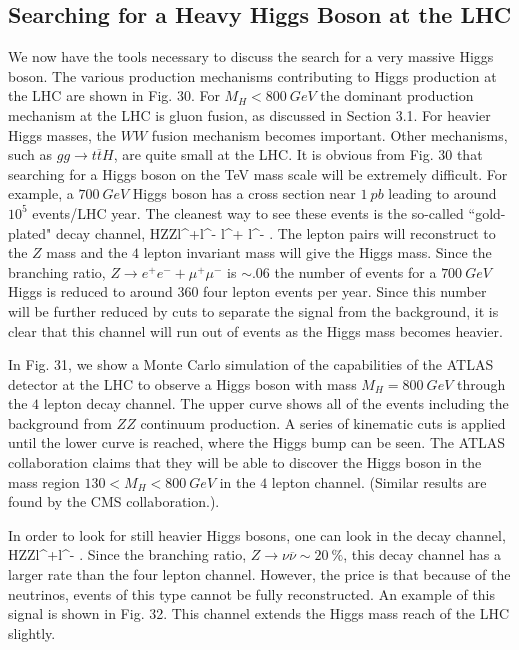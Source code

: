 \subsection{Searching for a Heavy Higgs Boson at the LHC}

We now have the tools necessary to discuss the search for a
very massive Higgs boson.   The various production mechanisms
contributing to Higgs production  at the LHC are shown in Fig. 30.
For $M_H< 800~GeV$ the dominant production mechanism at the LHC is gluon
fusion, as discussed in  Section 3.1.  For heavier Higgs masses,
the $WW$ fusion mechanism becomes important.
Other mechanisms, such as $gg\rightarrow t {\overline t} H$,
are quite small at the LHC.\cite{tth}  It is obvious
from Fig. 30 that searching for a Higgs boson on the TeV mass scale
will be extremely difficult.  For example, a $700~GeV$ Higgs boson
has a cross section near $1~pb$ leading to around $10^5$ events/LHC
year.  The cleanest way to see these events is the so-called
``gold-plated" decay channel,
\beq
H\rightarrow ZZ\rightarrow l^+l^- l^+ l^- .
\eeq
The lepton pairs will reconstruct to the $Z$ mass and the $4$
lepton invariant mass will give the Higgs mass.
Since the branching ratio,
 $Z\rightarrow e^+e^- + \mu^+\mu^-$ is $\sim .06$
the number of events for a $700~ GeV$ Higgs is reduced to around
$360$ four lepton events per year.  Since this number will be further
reduced by cuts to separate the signal from the background, it
is clear that this channel will run out of events as the Higgs
mass becomes heavier.\cite{zzgold}

In Fig. 31, we show a Monte Carlo simulation of the capabilities
of the ATLAS detector at the LHC to observe a Higgs boson with mass
$M_H=800~GeV$ through the $4$ lepton decay channel.\cite{atlas}
  The upper curve
shows all of the events including the background from $ZZ$ continuum
production.  A series of kinematic cuts is applied until the lower
curve is reached, where the Higgs bump can be seen.  The ATLAS
collaboration claims that they will be able to discover the
Higgs boson in the mass region $130< M_H < 800~GeV$ in the $4$
lepton channel.  (Similar results are found by the CMS
collaboration.\cite{cms}).

In order to look for still heavier Higgs bosons, one can look in the
decay channel,
\beq
H\rightarrow ZZ\rightarrow l^+l^- \nu \overline{\nu}.
\eeq
Since the branching ratio, $Z\rightarrow \nu \overline{\nu}\sim 20~\%$,
this decay channel has  a larger rate than the
four lepton channel.  However, the price is that
because of the neutrinos, events of this type cannot be fully
reconstructed.
An example of this signal is shown in Fig. 32.  This channel extends
the Higgs mass reach of the LHC slightly.

